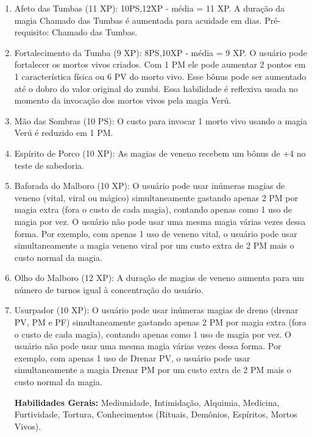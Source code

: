 \begin{enumerate}
	\item Afeto das Tumbas (11 XP): 10PS,12XP - média = 11 XP. A duração da magia Chamado das Tumbas é aumentada para acuidade em dias. Pré-requisito: Chamado das Tumbas. 
	
	\item Fortalecimento da Tumba (9 XP): 8PS,10XP - média = 9 XP. O usuário pode fortalecer os mortos vivos criados. Com 1 PM ele pode aumentar 2 pontos em 1 característica física ou 6 PV do morto vivo. Esse bônus pode ser aumentado até o dobro do valor original do zumbi. Essa habilidade é reflexiva usada no momento da invocação dos mortos vivos pela magia Verú.
	
	\item Mão das Sombras (10 PS): O custo para invocar 1 morto vivo usando a magia Verú é reduzido em 1 PM.
 

\item Espírito de Porco (10 XP): As magias de veneno recebem um bônus de +4 no teste de sabedoria. 

  	\item Baforada do Malboro (10 XP): O usuário pode usar inúmeras magias de veneno (vital, viral ou mágico) simultaneamente gastando apenas 2 PM por magia extra (fora o custo de cada magia), contando apenas como 1 uso de magia por vez. O usuário não pode usar uma mesma magia várias vezes dessa forma. Por exemplo, com apenas 1 uso de veneno vital, o usuário pode usar simultaneamente a magia veneno viral por um custo extra de 2 PM mais o custo normal da magia.

  	\item Olho do Malboro (12 XP): A duração de magias de veneno aumenta para um número de turnos igual à concentração do usuário.

		\item Usurpador (10 XP): O usuário pode usar inúmeras magias de dreno (drenar PV, PM e PF) simultaneamente gastando apenas 2 PM por magia extra (fora o custo de cada magia), contando apenas como 1 uso de magia por vez. O usuário não pode usar uma mesma magia várias vezes dessa forma. Por exemplo, com apenas 1 uso de Drenar PV, o usuário pode usar simultaneamente a magia Drenar PM por um custo extra de 2 PM mais o custo normal da magia.

  
\textbf{Habilidades Gerais:} Mediunidade, Intimidação, Alquimia, Medicina, Furtividade, Tortura, Conhecimentos (Rituais, Demônios, Espíritos, Mortos Vivos).
\end{enumerate}
  
